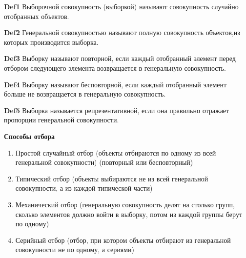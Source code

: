 \textbf{Def1} Выборочной совокупность (выборкой) называют совокупность случайно отобранных объектов.

\textbf{Def2} Генеральной совокупностью называют полную совокупность объектов,из которых производится выборка.

\textbf{Def3} Выборку называют повторной, если каждый отобранный элемент перед отбором следующего элемента возвращается в генеральную совокупность.

\textbf{Def4} Выборку называют бесповторной, если каждый отобранный элемент больше не возвращается в генеральную совокупность.

\textbf{Def5} Выборка называется репрезентативной, если она правильно отражает пропорции генеральной совокупности.

\textbf{Способы отбора}

\begin{enumerate}
 \item Простой случайный отбор (объекты отбираются по одному из всей генеральной совокупности) (повторный или бесповторный)
 \item Типический отбор (объекты выбираются не из всей генеральной совокупности, а из каждой типической части)
 \item Механический отбор (генеральную совокупность делят на столько групп, сколько элементов должно войти в выборку, потом из каждой группы берут по одному)
 \item Серийный отбор (отбор, при котором объекты отбирают из генеральной совокупности не по одному, а сериями)
\end{enumerate}
